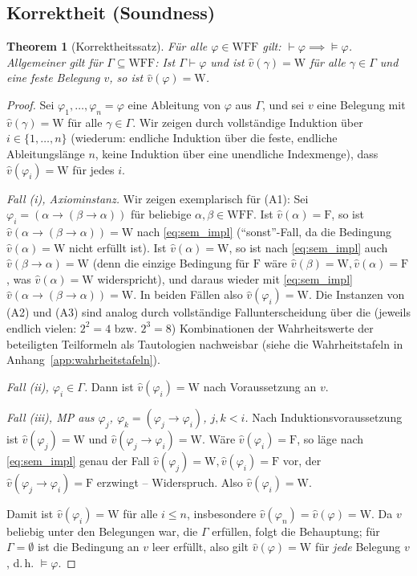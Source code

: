 \documentclass[12pt, a4paper]{article}
\newtheorem{theorem}{Theorem}[section]
\theoremstyle{definition}
\theoremstyle{remark}
\newcommand{\W}{\mathrm{W}}
\newcommand{\F}{\mathrm{F}}
\newcommand{\WFF}{\mathrm{WFF}}
\begin{document}
\subsection{Korrektheit (Soundness)}
\label{subsec:korrektheit}

\begin{theorem}[Korrektheitssatz]
\label{thm:korrektheit}
Für alle $\varphi \in \WFF$ gilt: $\vdash \varphi \implies \models \varphi$. Allgemeiner gilt für $\Gamma\subseteq\WFF$: Ist $\Gamma \vdash \varphi$ und ist $\hat v(\gamma)=\W$ für alle $\gamma\in\Gamma$ und eine feste Belegung $v$, so ist $\hat v(\varphi) = \W$.
\end{theorem}
\begin{proof}
Sei $\varphi_1,\dots,\varphi_n=\varphi$ eine Ableitung von $\varphi$ aus $\Gamma$, und sei $v$ eine Belegung mit $\hat v(\gamma)=\W$ für alle $\gamma\in\Gamma$. Wir zeigen durch vollständige Induktion über $i\in\{1,\dots,n\}$ (wiederum: endliche Induktion über die feste, endliche Ableitungslänge $n$, keine Induktion über eine unendliche Indexmenge), dass $\hat v(\varphi_i)=\W$ für jedes $i$.

\emph{Fall (i), Axiominstanz.} Wir zeigen exemplarisch für (A1): Sei $\varphi_i = (\alpha\to(\beta\to\alpha))$ für beliebige $\alpha,\beta\in\WFF$. Ist $\hat v(\alpha)=\F$, so ist $\hat v(\alpha\to(\beta\to\alpha))=\W$ nach \eqref{eq:sem_impl} (``sonst''-Fall, da die Bedingung $\hat v(\alpha)=\W$ nicht erfüllt ist). Ist $\hat v(\alpha)=\W$, so ist nach \eqref{eq:sem_impl} auch $\hat v(\beta\to\alpha)=\W$ (denn die einzige Bedingung für $\F$ wäre $\hat v(\beta)=\W,\hat v(\alpha)=\F$, was $\hat v(\alpha)=\W$ widerspricht), und daraus wieder mit \eqref{eq:sem_impl} $\hat v(\alpha\to(\beta\to\alpha))=\W$. In beiden Fällen also $\hat v(\varphi_i)=\W$. Die Instanzen von (A2) und (A3) sind analog durch vollständige Fallunterscheidung über die (jeweils endlich vielen: $2^2=4$ bzw. $2^3=8$) Kombinationen der Wahrheitswerte der beteiligten Teilformeln als Tautologien nachweisbar (siehe die Wahrheitstafeln in Anhang~\ref{app:wahrheitstafeln}).

\emph{Fall (ii), $\varphi_i \in \Gamma$.} Dann ist $\hat v(\varphi_i)=\W$ nach Voraussetzung an $v$.

\emph{Fall (iii), MP aus $\varphi_j$, $\varphi_k=(\varphi_j\to\varphi_i)$, $j,k<i$.} Nach Induktionsvoraussetzung ist $\hat v(\varphi_j)=\W$ und $\hat v(\varphi_j\to\varphi_i)=\W$. Wäre $\hat v(\varphi_i)=\F$, so läge nach \eqref{eq:sem_impl} genau der Fall $\hat v(\varphi_j)=\W,\hat v(\varphi_i)=\F$ vor, der $\hat v(\varphi_j\to\varphi_i)=\F$ erzwingt -- Widerspruch. Also $\hat v(\varphi_i)=\W$.

Damit ist $\hat v(\varphi_i)=\W$ für alle $i\le n$, insbesondere $\hat v(\varphi_n)=\hat v(\varphi)=\W$. Da $v$ beliebig unter den Belegungen war, die $\Gamma$ erfüllen, folgt die Behauptung; für $\Gamma=\emptyset$ ist die Bedingung an $v$ leer erfüllt, also gilt $\hat v(\varphi)=\W$ für \emph{jede} Belegung $v$, d.\,h. $\models\varphi$.
\end{proof}
\end{document}
